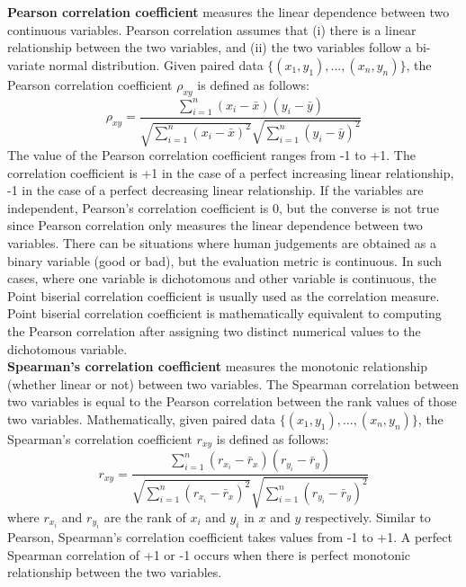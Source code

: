 \noindent \textbf{Pearson correlation coefficient} measures the linear dependence between two continuous variables. Pearson correlation assumes that (i) there is a linear relationship between the two variables, and (ii) the two variables follow a bi-variate normal distribution. Given paired data $\{(x_{1},y_{1}),\dots ,(x_{n},y_{n})\}$, the Pearson correlation coefficient $\rho_{xy}$ is defined as follows:
\begin{equation*}
    {\rho_{xy}={\frac {\sum _{i=1}^{n}(x_{i}-{\bar {x}})(y_{i}-{\bar {y}})}{{\sqrt {\sum _{i=1}^{n}(x_{i}-{\bar {x}})^{2}}}{\sqrt {\sum _{i=1}^{n}(y_{i}-{\bar {y}})^{2}}}}}}
\end{equation*}
The value of the Pearson correlation coefficient ranges from -1 to +1. The correlation coefficient is +1 in the case of a perfect increasing linear relationship, -1 in the case of a perfect decreasing linear relationship. If the variables are independent, Pearson's correlation coefficient is 0, but the converse is not true since Pearson correlation only measures the linear dependence between two variables.
There can be situations where human judgements are obtained as a binary variable (good or bad), but the evaluation metric is continuous. In such cases, where one variable is dichotomous and other variable is continuous, the Point biserial correlation 
coefficient is usually used as the correlation measure. Point biserial correlation coefficient is mathematically equivalent to computing the Pearson correlation after assigning two distinct numerical values to the dichotomous variable. \\
\noindent \textbf{Spearman's correlation coefficient} measures the monotonic relationship (whether linear or not) between two variables. The Spearman correlation between two variables is equal to the Pearson correlation between the rank values of those two variables. Mathematically, given paired data $\{(x_{1},y_{1}),\dots ,(x_{n},y_{n})\}$, the Spearman's correlation coefficient $r_{xy}$ is defined as follows:
\begin{equation*}
    {r_{xy}={\frac {\sum _{i=1}^{n}(r_{x_{i}}-{\bar r_{x}})(r_{y_{i}}-{\bar r_{y}})}{{\sqrt {\sum _{i=1}^{n}(r_{x_{i}}-{\bar r_{x}})^{2}}}{\sqrt {\sum _{i=1}^{n}(r_{y_{i}}-{\bar r_{y}})^{2}}}}}}
\end{equation*}
where $r_{x_{i}}$ and $r_{y_{i}}$ are the rank of $x_{i}$ and $y_{i}$ in $x$ and $y$ respectively. Similar to Pearson, Spearman's correlation coefficient takes values from -1 to +1. A perfect Spearman correlation of +1 or -1 
occurs when there is perfect monotonic relationship between the two variables. \\
